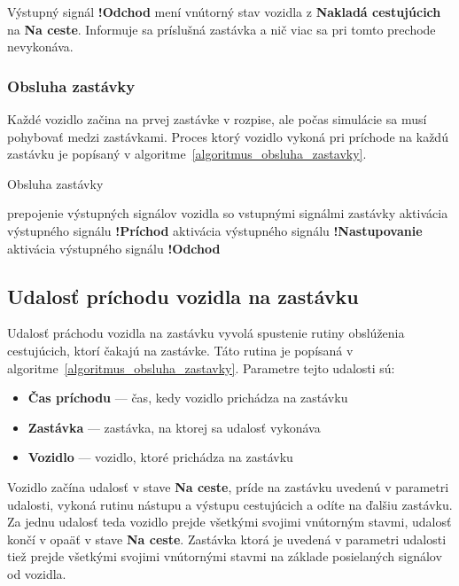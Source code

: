 Výstupný signál \textbf{!Odchod} mení vnútorný stav vozidla z \textbf{Nakladá cestujúcich} na \textbf{Na ceste}.
Informuje sa príslušná zastávka a nič viac sa pri tomto prechode nevykonáva.

\subsubsection{Obsluha zastávky}

Každé vozidlo začina na prvej zastávke v rozpise, ale počas simulácie sa musí pohybovať medzi zastávkami.
Proces ktorý vozidlo vykoná pri príchode na každú zastávku je popísaný v algoritme~\ref{algoritmus_obsluha_zastavky}.

\vspace*{\dimexpr0.5\baselineskip\relax}
\begin{algorithm}[H]\label{algoritmus_obsluha_zastavky}
\caption{Obsluha zastávky}
  prepojenie výstupných signálov vozidla so vstupnými signálmi zastávky\;
  aktivácia výstupného signálu \textbf{!Príchod}\;
  aktivácia výstupného signálu \textbf{!Nastupovanie}\;
  aktivácia výstupného signálu \textbf{!Odchod}\;
\end{algorithm}

\subsection*{Udalosť príchodu vozidla na zastávku}

Udalosť práchodu vozidla na zastávku vyvolá spustenie rutiny obslúženia cestujúcich, ktorí čakajú na zastávke. Táto rutina je popísaná v algoritme~\ref{algoritmus_obsluha_zastavky}.
Parametre tejto udalosti sú:
\begin{itemize}
  \item \textbf{Čas príchodu} --- čas, kedy vozidlo prichádza na zastávku
  \item \textbf{Zastávka} --- zastávka, na ktorej sa udalosť vykonáva
  \item \textbf{Vozidlo} --- vozidlo, ktoré prichádza na zastávku
\end{itemize}

Vozidlo začína udalosť v stave \textbf{Na ceste}, príde na zastávku uvedenú v parametri udalosti, vykoná rutinu nástupu a výstupu cestujúcich a odíte na ďalšiu zastávku.
Za jednu udalosť teda vozidlo prejde všetkými svojimi vnútorným stavmi, udalosť končí v opaäť v stave \textbf{Na ceste}.
Zastávka ktorá je uvedená v parametri udalosti tiež prejde všetkými svojimi vnútornými stavmi na základe posielaných signálov od vozidla.

